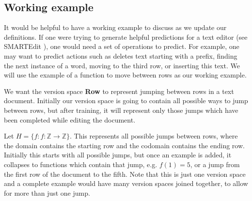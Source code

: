 \documentclass{article}
\theoremstyle{definition}
\begin{document}
%
%

\subsection{Working example}
It would be helpful to have a working example to discuss as we update our definitions. If one were trying to generate helpful predictions for a text editor (see SMARTEdit \cite{short}), one would need a set of operations to predict. For example, one may want to predict actions such as deletes text starting with a prefix, finding the next instance of a word, moving to the third row, or inserting this text. We will use the example of a function to move between rows as our working example. 

We want the version space \textbf{Row} to represent jumping between rows in a text document. Initially our version space is going to contain all possible ways to jump between rows, but after training, it will represent only those jumps which have been completed while editing the document. 

Let $H = \{f: f: \mathbb{Z} \rightarrow \mathbb{Z}\}$. This represents all possible jumps between rows, where the domain contains the starting row and the codomain contains the ending row. Initially this starts with all possible jumps, but once an example is added, it collapses to functions which contain that jump, e.g. $f(1) = 5$, or a jump from the first row of the document to the fifth. Note that this is just one version space and a complete example would have many version spaces joined together, to allow for more than just one jump. 
\end{document}
